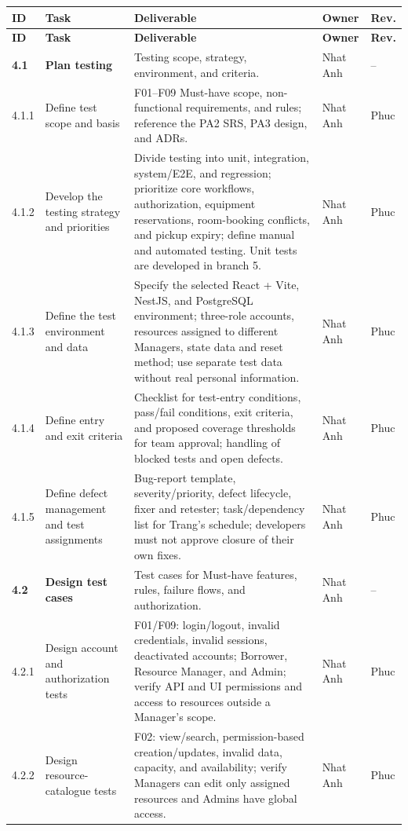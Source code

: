 \documentclass[11pt]{article}
\begin{document}
\begin{longtable}{@{}L{1.15cm}L{3.2cm}L{7.6cm}L{1.4cm}L{1.4cm}@{}}
\toprule
\textbf{ID} & \textbf{Task} & \textbf{Deliverable} & \textbf{Owner} & \textbf{Rev.} \\
\midrule\endfirsthead\toprule
\textbf{ID} & \textbf{Task} & \textbf{Deliverable} & \textbf{Owner} & \textbf{Rev.} \\
\midrule\endhead
\textbf{4.1} & \textbf{Plan testing} & Testing scope, strategy, environment, and criteria. & Nhat Anh & -- \\
4.1.1 & Define test scope and basis & F01--F09 Must-have scope, non-functional requirements, and rules; reference the PA2 SRS, PA3 design, and ADRs. & Nhat Anh & Phuc \\
4.1.2 & Develop the testing strategy and priorities & Divide testing into unit, integration, system/E2E, and regression; prioritize core workflows, authorization, equipment reservations, room-booking conflicts, and pickup expiry; define manual and automated testing. Unit tests are developed in branch 5. & Nhat Anh & Phuc \\
4.1.3 & Define the test environment and data & Specify the selected React + Vite, NestJS, and PostgreSQL environment; three-role accounts, resources assigned to different Managers, state data and reset method; use separate test data without real personal information. & Nhat Anh & Phuc \\
4.1.4 & Define entry and exit criteria & Checklist for test-entry conditions, pass/fail conditions, exit criteria, and proposed coverage thresholds for team approval; handling of blocked tests and open defects. & Nhat Anh & Phuc \\
4.1.5 & Define defect management and test assignments & Bug-report template, severity/priority, defect lifecycle, fixer and retester; task/dependency list for Trang's schedule; developers must not approve closure of their own fixes. & Nhat Anh & Phuc \\
\textbf{4.2} & \textbf{Design test cases} & Test cases for Must-have features, rules, failure flows, and authorization. & Nhat Anh & -- \\
4.2.1 & Design account and authorization tests & F01/F09: login/logout, invalid credentials, invalid sessions, deactivated accounts; Borrower, Resource Manager, and Admin; verify API and UI permissions and access to resources outside a Manager's scope. & Nhat Anh & Phuc \\
4.2.2 & Design resource-catalogue tests & F02: view/search, permission-based creation/updates, invalid data, capacity, and availability; verify Managers can edit only assigned resources and Admins have global access. & Nhat Anh & Phuc \\

\end{longtable}
\end{document}
